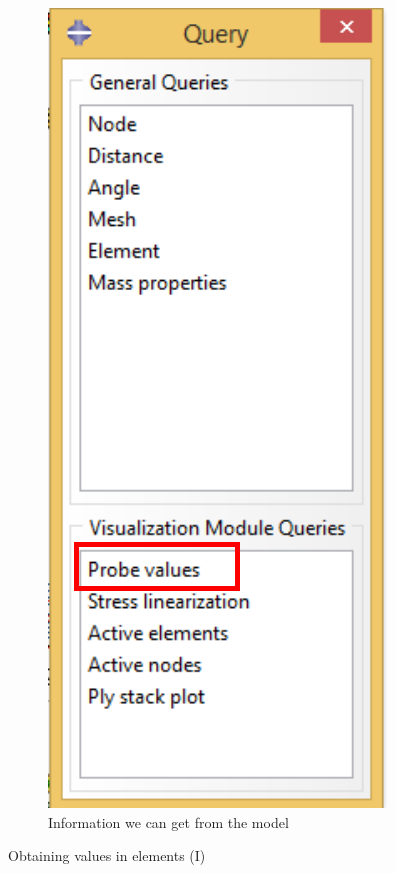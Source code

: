 \begin{enumerate}
\begin{figure}[H]
    \begin{subfigure}{0.32\textwidth}
      \includegraphics[width=\textwidth]{./body/images/imagen89.pdf}
      \caption{Information we can get from the model}
      \label{figu89}
    \end{subfigure}%
    \caption{Obtaining values in elements (I)}
  \end{figure}


\end{enumerate}

